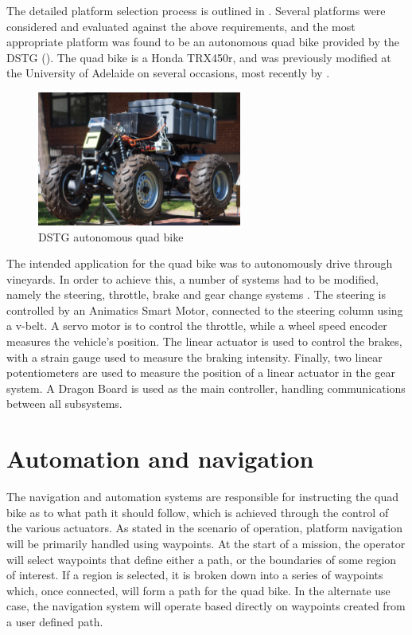 \documentclass[main.tex]{subfiles}
\begin{document}
The detailed platform selection process is outlined in . Several platforms were considered and evaluated against the above requirements, and the most appropriate platform was found to be an autonomous quad bike provided by the DSTG (). The quad bike is a Honda TRX450r, and was previously modified at the University of Adelaide on several occasions, most recently by \textcite{scheiner2011}. 

\begin{figure}[ht]
\includegraphics[width=0.6\textwidth]{3-ConceptDesign/bike.JPG}
\centering
\caption{DSTG autonomous quad bike} 
\end{figure}

The intended application for the quad bike was to autonomously drive through vineyards. In order to achieve this, a number of systems had to be modified, namely the steering, throttle, brake and gear change systems \parencite{scheiner2011}. The steering is controlled by an Animatics Smart Motor, connected to the steering column using a v-belt. A servo motor is to control the throttle, while a wheel speed encoder measures the vehicle's position. The linear actuator is used to control the brakes, with a strain gauge used to measure the braking intensity. Finally, two linear potentiometers are used to measure the position of a linear actuator in the gear system. A Dragon Board is used as the main controller, handling communications between all subsystems. 

\section{Automation and navigation}
The navigation and automation systems are responsible for instructing the quad bike as to what path it should follow, which is achieved through the control of the various actuators. As stated in the scenario of operation, platform navigation will be primarily handled using waypoints. At the start of a mission, the operator will select waypoints that define either a path, or the boundaries of some region of interest. If a region is selected, it is broken down into a series of waypoints which, once connected, will form a path for the quad bike. In the alternate use case, the navigation system will operate based directly on waypoints created from a user defined path.
\end{document}
